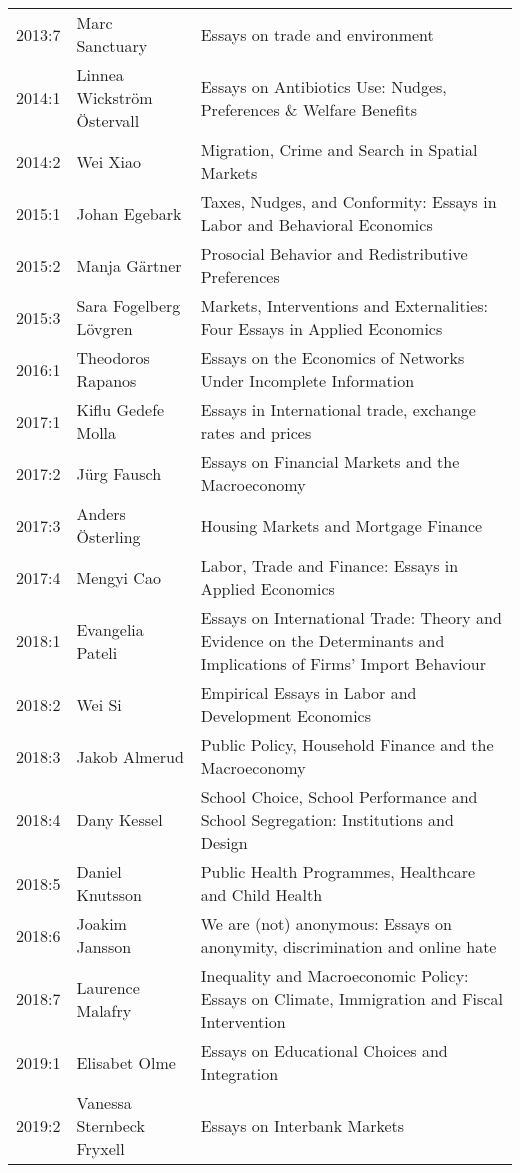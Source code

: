 {\begin{longtable}{p{} p{} p{}}
    2013:7 & Marc Sanctuary & Essays on trade and environment \\
    2014:1 & Linnea Wickström Östervall & Essays on Antibiotics Use: Nudges, Preferences \& Welfare Benefits \\
    2014:2 & Wei Xiao & Migration, Crime and Search in Spatial Markets \\
    2015:1 & Johan Egebark & Taxes, Nudges, and Conformity: Essays in Labor and Behavioral Economics \\
    2015:2 & Manja Gärtner & Prosocial Behavior and Redistributive Preferences \\
    2015:3 & Sara Fogelberg Lövgren & Markets, Interventions and Externalities: Four Essays in Applied Economics \\
    2016:1 & Theodoros Rapanos & Essays on the Economics of Networks Under Incomplete Information \\
    2017:1 & Kiflu Gedefe Molla & Essays in International trade, exchange rates and prices \\
    2017:2 & Jürg Fausch & Essays on Financial Markets and the Macroeconomy \\
    2017:3 & Anders Österling & Housing Markets and Mortgage Finance \\
    2017:4 & Mengyi Cao & Labor, Trade and Finance: Essays in Applied Economics \\
    2018:1 & Evangelia Pateli & Essays on International Trade: Theory and Evidence on the Determinants and Implications of Firms' Import Behaviour \\
    2018:2 & Wei Si & Empirical Essays in Labor and Development Economics \\
    2018:3 & Jakob Almerud & Public Policy, Household Finance and the Macroeconomy \\
    2018:4 & Dany Kessel & School Choice, School Performance and School Segregation: Institutions and Design \\
    2018:5 & Daniel Knutsson & Public Health Programmes, Healthcare and Child Health \\
    2018:6 & Joakim Jansson & We are (not) anonymous: Essays on anonymity, discrimination and online hate \\
    2018:7 & Laurence Malafry & Inequality and Macroeconomic Policy: Essays on Climate, Immigration and Fiscal Intervention \\
    2019:1 & Elisabet Olme & Essays on Educational Choices and Integration \\
    2019:2 & Vanessa Sternbeck Fryxell & Essays on Interbank Markets \\

\end{longtable}}
